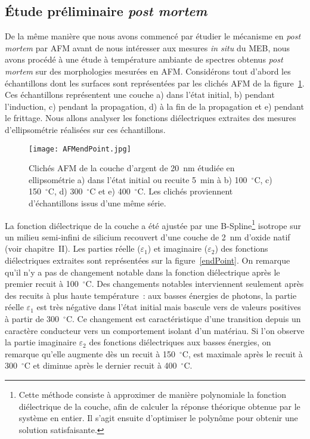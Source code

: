 \subsection{Étude préliminaire \textit{post mortem}}
De la même manière que nous avons commencé par étudier le mécanisme en \textit{post mortem} par AFM avant de nous intéresser aux mesures \textit{in situ} du MEB, nous avons procédé à une étude à température ambiante de spectres obtenus \textit{post mortem} sur des morphologies mesurées en AFM. Considérons tout d'abord les échantillons dont les surfaces sont représentées par les clichés AFM de la figure~\ref{AFMendPoint}. Ces échantillons représentent une couche a) dans l'état initial, b) pendant l'induction, c) pendant la propagation, d) à la fin de la propagation et e) pendant le frittage. Nous allons analyser les fonctions diélectriques extraites des mesures d'ellipsométrie réalisées sur ces échantillons.\par 

\begin{figure}[h]
	\centering
	\texttt{[image: AFMendPoint.jpg]}
	\caption{Clichés AFM de la couche d'argent de 20~nm étudiée en ellipsométrie a) dans l'état initial ou recuite 5~min à b) 100~$^\circ$C, c) 150~$^\circ$C, d) 300~$^\circ$C et e) 400~$^\circ$C. Les clichés proviennent d'échantillons issus d'une même série.}
	\label{AFMendPoint}
\end{figure}

La fonction diélectrique de la couche a été ajustée par une B-Spline\footnote{Cette méthode consiste à approximer de manière polynomiale la fonction diélectrique de la couche, afin de calculer la réponse théorique obtenue par le système en entier. Il s'agit ensuite d'optimiser le polynôme pour obtenir une solution satisfaisante.} isotrope sur un milieu semi-infini de silicium recouvert d'une couche de 2~nm d'oxide natif (voir chapitre~II). Les parties réelle ($\varepsilon_1$) et imaginaire ($\varepsilon_2$) des fonctions diélectriques extraites sont représentées sur la figure~\ref{endPoint}. On remarque qu'il n'y a pas de changement notable dans la fonction diélectrique après le premier recuit à 100~$^\circ$C. Des changements notables interviennent seulement après des recuits à plus haute température~: aux basses énergies de photons, la partie réelle $\varepsilon_1$ est très négative dans l'état initial mais bascule vers de valeurs positives à partir de 300~$^\circ$C. Ce changement est caractéristique d'une transition depuis un caractère conducteur vers un comportement isolant d'un matériau. Si l'on observe la partie imaginaire $\varepsilon_2$ des fonctions diélectriques aux basses énergies, on remarque qu'elle augmente dès un recuit à 150~$^\circ$C, est maximale après le recuit à 300~$^\circ$C et diminue après le dernier recuit à 400~$^\circ$C.\par

